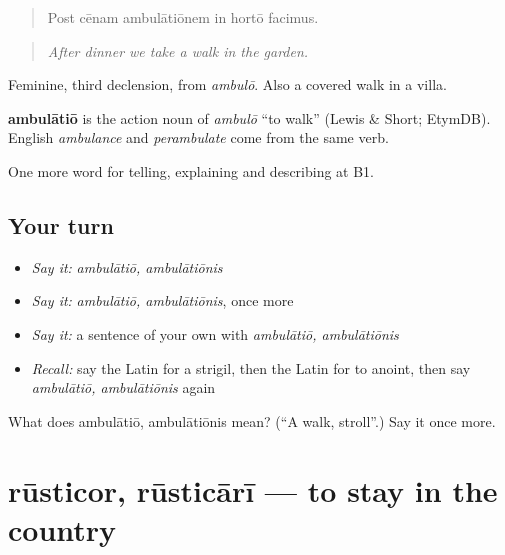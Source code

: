 \begin{quote}
Post cēnam ambulātiōnem in hortō facimus.
\end{quote}

\begin{quote}
\emph{After dinner we take a walk in the garden.}
\end{quote}

Feminine, third declension, from \emph{ambulō}. Also a covered walk in a villa.

\begin{cousinweb}
\textbf{ambulātiō} is the action noun of \emph{ambulō} \textquotedblleft{}to walk\textquotedblright{} (Lewis \& Short; EtymDB). English \emph{ambulance} and \emph{perambulate} come from the same verb.
\end{cousinweb}

\begin{grammarlens}[title={What you've built}]
One more word for telling, explaining and describing at B1.
\end{grammarlens}

\subsection*{Your turn}
\begin{itemize}
\raggedright
  \item \emph{Say it:} \emph{ambulātiō, ambulātiōnis}
  \item \emph{Say it:} \emph{ambulātiō, ambulātiōnis}, once more
  \item \emph{Say it:} a sentence of your own with \emph{ambulātiō, ambulātiōnis}
  \item \emph{Recall:} say the Latin for a strigil, then the Latin for to anoint, then say \emph{ambulātiō, ambulātiōnis} again
\end{itemize}

\begin{tcolorbox}[breakable,colback=teal!4,colframe=teal!35!black,title={Before you move on}]
What does ambulātiō, ambulātiōnis mean? (\textquotedblleft{}A walk, stroll\textquotedblright{}.) Say it once more.
\end{tcolorbox}
\section[rūsticor, rūsticārī]{rūsticor, rūsticārī — to stay in the country}

\label{lesson:LA-C542-rusticor}



